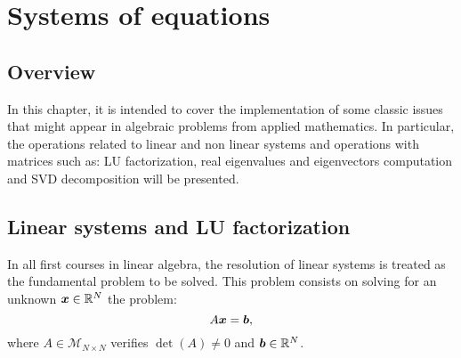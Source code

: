 
    
    \chapter{Systems of equations}
    \label{Dev:Linear_Algebra}
    
    \section{Overview}

    In this chapter, it is intended to cover the implementation of some classic issues that might appear in algebraic problems from applied mathematics. In particular, the operations related to linear and non linear systems and operations with matrices such as: LU factorization, real eigenvalues and eigenvectors computation and SVD decomposition will be presented.
    
   
 
 
 
 
 
 
\newpage 
 \section{Linear systems and LU factorization}
 
 In all first courses in linear algebra, the resolution of linear systems is treated as the fundamental problem to be solved. This problem consists on solving for an unknown $\boldsymbol{x} \in \mathbb{R}^N$ the problem:
 \begin{equation}
 A \boldsymbol{x} = \boldsymbol{b}, \label{eq:Axb}
 \end{equation}
 where $A\in\mathcal{M}_{N\times N}$ verifies $\det(A)\neq0$ and $\boldsymbol{b} \in \mathbb{R}^N$.
 
